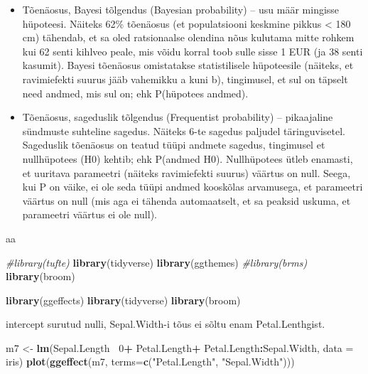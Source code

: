 \documentclass[]{book}
\newenvironment{Shaded}{\begin{snugshade}}{\end{snugshade}}
\newcommand{\KeywordTok}[1]{\textcolor[rgb]{0.13,0.29,0.53}{\textbf{#1}}}
\newcommand{\DataTypeTok}[1]{\textcolor[rgb]{0.13,0.29,0.53}{#1}}
\newcommand{\DecValTok}[1]{\textcolor[rgb]{0.00,0.00,0.81}{#1}}
\newcommand{\StringTok}[1]{\textcolor[rgb]{0.31,0.60,0.02}{#1}}
\newcommand{\CommentTok}[1]{\textcolor[rgb]{0.56,0.35,0.01}{\textit{#1}}}
\newcommand{\OperatorTok}[1]{\textcolor[rgb]{0.81,0.36,0.00}{\textbf{#1}}}
\newcommand{\NormalTok}[1]{#1}
\begin{document}
\begin{itemize}
\item
  Tõenäosus, Bayesi tõlgendus (Bayesian probability) -- usu määr
  mingisse hüpoteesi. Näiteks 62\% tõenäosus (et populatsiooni keskmine
  pikkus \textless{} 180 cm) tähendab, et sa oled ratsionaalse olendina
  nõus kulutama mitte rohkem kui 62 senti kihlveo peale, mis võidu
  korral toob sulle sisse 1 EUR (ja 38 senti kasumit). Bayesi tõenäosus
  omistatakse statistilisele hüpoteesile (näiteks, et ravimiefekti
  suurus jääb vahemikku a kuni b), tingimusel, et sul on täpselt need
  andmed, mis sul on; ehk P(hüpotees \textbar{} andmed).
\item
  Tõenäosus, sageduslik tõlgendus (Frequentist probability) --
  pikaajaline sündmuste suhteline sagedus. Näiteks 6-te sagedus paljudel
  täringuvisetel. Sageduslik tõenäosus on teatud tüüpi andmete sagedus,
  tingimusel et nullhüpotees (H0) kehtib; ehk P(andmed \textbar{} H0).
  Nullhüpotees ütleb enamasti, et uuritava parameetri (näiteks
  ravimiefekti suurus) väärtus on null. Seega, kui P on väike, ei ole
  seda tüüpi andmed kooskõlas arvamusega, et parameetri väärtus on null
  (mis aga ei tähenda automaatselt, et sa peaksid uskuma, et parameetri
  väärtus ei ole null).
\end{itemize}

aa

\begin{Shaded}
\begin{Highlighting}[]
\CommentTok{#library(tufte)}
\KeywordTok{library}\NormalTok{(tidyverse)}
\KeywordTok{library}\NormalTok{(ggthemes)}
\CommentTok{#library(brms)}
\KeywordTok{library}\NormalTok{(broom)}
\end{Highlighting}
\end{Shaded}

\begin{Shaded}
\begin{Highlighting}[]
\KeywordTok{library}\NormalTok{(ggeffects)}
\KeywordTok{library}\NormalTok{(tidyverse)}
\KeywordTok{library}\NormalTok{(broom)}
\end{Highlighting}
\end{Shaded}

intercept surutud nulli, Sepal.Width-i tõus ei sõltu enam
Petal.Lenthgist.

\begin{Shaded}
\begin{Highlighting}[]
\NormalTok{m7 <-}\StringTok{ }\KeywordTok{lm}\NormalTok{(Sepal.Length}\OperatorTok{~}\StringTok{ }\DecValTok{0}\OperatorTok{+}\StringTok{ }\NormalTok{Petal.Length}\OperatorTok{+}\StringTok{ }\NormalTok{Petal.Length}\OperatorTok{:}\NormalTok{Sepal.Width, }\DataTypeTok{data =}\NormalTok{ iris)}
\KeywordTok{plot}\NormalTok{(}\KeywordTok{ggeffect}\NormalTok{(m7, }\DataTypeTok{terms=}\KeywordTok{c}\NormalTok{(}\StringTok{"Petal.Length"}\NormalTok{, }\StringTok{"Sepal.Width"}\NormalTok{)))}
\end{Highlighting}
\end{Shaded}
\end{document}
